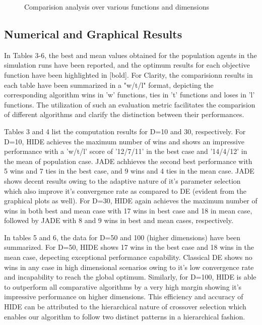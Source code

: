 \begin{figure*}[h!]
    \caption{Comparision analysis over various functions and dimensions}
    \vspace{-4mm}
\end{figure*}


\subsection{Numerical and Graphical Results} 

In Tables 3-6, the best and mean values obtained for the population agents in the simulation runs have been reported, and the optimum results for each objective function have been highlighted in [bold]. For Clarity, the comparisionn results in each table have been summarized in a "w/t/l" format, depicting the corresponding algorithm wins in 'w' functions, ties in 't' functions and loses in 'l' functions. The utilization of such an evaluation metric facilitates the comparision of different algorithms and clarify the distinction between their performances.

Tables 3 and 4 list the computation results for D=10 and 30, respectively. For D=10, HIDE achieves the maximum number of wins and shows an impressive performance with a 'w/t/l' score of '12/7/11' in the best case and '14/4/12' in the mean of population case. JADE achhieves the second best performance with 5 wins and 7 ties in the best case, and 9 wins and 4 ties in the mean case. JADE shows decent results owing to the adaptive nature of it's parameter selection which also improve it's convergence rate as compared to DE (evident from the graphical plots as well). For D=30, HIDE again achieves the maximum number of wins in both best and mean case with 17 wins in best case and 18 in mean case, followed by JADE with 8 and 9 wins in best and mean cases, respectively.

In tables 5 and 6, the data for D=50 and 100 (higher dimensions) have been summarized. For D=50, HIDE shows 17 wins in the best case and 18 wins in the mean case, depecting exceptional performance capability. Classical DE shows no wins in any case in high dimensional scenarios owing to it's low convergence rate and incapability to reach the global optimum. Similarly, for D=100, HIDE is able to outperform all comparative algorithms by a very high margin showing it's impressive performance on higher dimensions. This efficiency and accuracy of HIDE can be attributed to the hierarchical nature of crossover selection which enables our algorithm to follow two distinct patterns in a hierarchical fashion.

